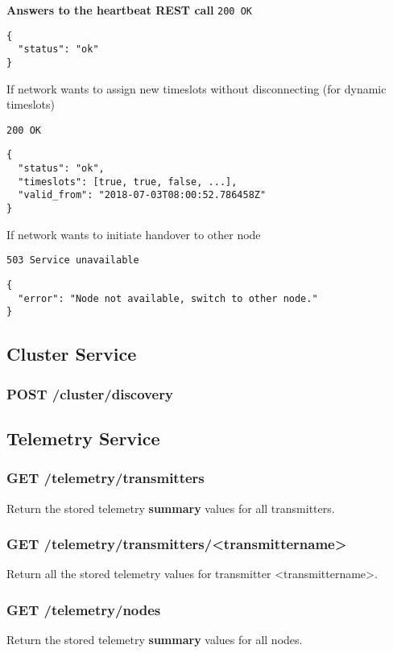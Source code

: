 \textbf{Answers to the heartbeat REST call}
\texttt{200 OK}
\begin{lstlisting}
{
  "status": "ok"
}
\end{lstlisting}

If network wants to assign new timeslots without disconnecting (for dynamic timeslots)

\texttt{200 OK}
\begin{lstlisting}
{
  "status": "ok",
  "timeslots": [true, true, false, ...],
  "valid_from": "2018-07-03T08:00:52.786458Z"
}
\end{lstlisting}

If network wants to initiate handover to other node

\texttt{503 Service unavailable}
\begin{lstlisting}
{
  "error": "Node not available, switch to other node."
}
\end{lstlisting}


\subsection{Cluster Service}

\subsubsection{POST /cluster/discovery}


\subsection{Telemetry Service}

\subsubsection{GET /telemetry/transmitters}
Return the stored telemetry \textbf{summary} values for all transmitters.

\subsubsection{GET /telemetry/transmitters/<transmittername>}
Return all the stored telemetry values for transmitter <transmittername>.

\subsubsection{GET /telemetry/nodes}
Return the stored telemetry \textbf{summary} values for all nodes.

